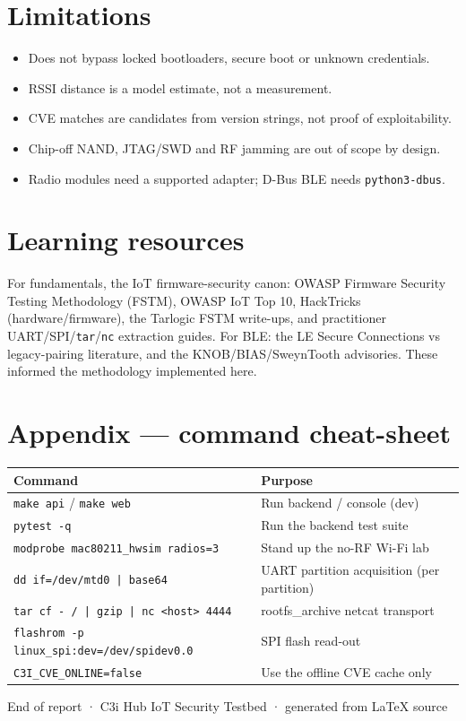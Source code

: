 \documentclass[11pt]{article}
\newif\ifintable\intablefalse
\begin{document}
\section{Limitations}
\begin{itemize}
  \item Does not bypass locked bootloaders, secure boot or unknown credentials.
  \item RSSI distance is a model estimate, not a measurement.
  \item CVE matches are candidates from version strings, not proof of exploitability.
  \item Chip-off NAND, JTAG/SWD and RF jamming are out of scope by design.
  \item Radio modules need a supported adapter; D-Bus BLE needs \texttt{python3-dbus}.
\end{itemize}

\section{Learning resources}
For fundamentals, the IoT firmware-security canon: OWASP Firmware Security Testing
Methodology (FSTM), OWASP IoT Top 10, HackTricks (hardware/firmware), the Tarlogic
FSTM write-ups, and practitioner UART/SPI/\texttt{tar}/\texttt{nc} extraction
guides. For BLE: the LE Secure Connections vs legacy-pairing literature, and the
KNOB/BIAS/SweynTooth advisories. These informed the methodology implemented here.

\section{Appendix --- command cheat-sheet}
\begin{table}[h]
\centering\footnotesize\intabletrue
\begin{tabularx}{\textwidth}{@{}L{6.5cm} X@{}}
\toprule
\textbf{Command} & \textbf{Purpose}\\
\midrule
\texttt{make api} / \texttt{make web} & Run backend / console (dev)\\
\texttt{pytest -q} & Run the backend test suite\\
\texttt{modprobe mac80211\_hwsim radios=3} & Stand up the no-RF Wi-Fi lab\\
\texttt{dd if=/dev/mtd0 | base64} & UART partition acquisition (per partition)\\
\texttt{tar cf - / | gzip | nc <host> 4444} & rootfs\_archive netcat transport\\
\texttt{flashrom -p linux\_spi:dev=/dev/spidev0.0} & SPI flash read-out\\
\texttt{C3I\_CVE\_ONLINE=false} & Use the offline CVE cache only\\
\bottomrule
\end{tabularx}
\end{table}

\vfill
\begin{center}\footnotesize\color{slate}
End of report · C3i Hub IoT Security Testbed · generated from LaTeX source
\end{center}
\end{document}
